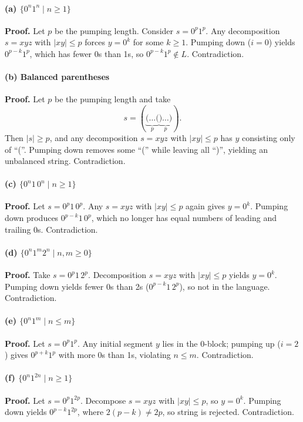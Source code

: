 \documentclass{article}
\theoremstyle{theorem}
\theoremstyle{definition}
\theoremstyle{remark}
\begin{document}
\paragraph{(a) \(\{0^n1^n\mid n\ge1\}\)}
\textbf{Proof.} Let \(p\) be the pumping length. Consider \(s=0^p1^p\). Any decomposition \(s=xyz\) with \(\lvert xy\rvert\le p\) forces \(y=0^k\) for some \(k\ge1\). Pumping down (\(i=0\)) yields \(0^{p-k}1^p\), which has fewer 0s than 1s, so \(0^{p-k}1^p\notin L\). Contradiction.

\paragraph{(b) Balanced parentheses}
\textbf{Proof.} Let \(p\) be the pumping length and take 
\[
s = (\underbrace{( \dots (}_{p}\underbrace{) \dots )}_{p}).
\]
Then \(\lvert s\rvert\ge p\), and any decomposition \(s=xyz\) with \(\lvert xy\rvert\le p\) has \(y\) consisting only of “(”. Pumping down removes some “(” while leaving all “)”, yielding an unbalanced string. Contradiction.

\paragraph{(c) \(\{0^n1\,0^n\mid n\ge1\}\)}
\textbf{Proof.} Let \(s=0^p1\,0^p\). Any \(s=xyz\) with \(\lvert xy\rvert\le p\) again gives \(y=0^k\). Pumping down produces \(0^{p-k}1\,0^p\), which no longer has equal numbers of leading and trailing 0s. Contradiction.

\paragraph{(d) \(\{0^n1^m2^n\mid n,m\ge0\}\)}
\textbf{Proof.} Take \(s=0^p1\,2^p\). Decomposition \(s=xyz\) with \(\lvert xy\rvert\le p\) yields \(y=0^k\). Pumping down yields fewer 0s than 2s (\(0^{p-k}1\,2^p\)), so not in the language. Contradiction.

\paragraph{(e) \(\{0^n1^m\mid n\le m\}\)}
\textbf{Proof.} Let \(s=0^p1^p\). Any initial segment \(y\) lies in the 0-block; pumping up (\(i=2\)) gives \(0^{p+k}1^p\) with more 0s than 1s, violating \(n\le m\). Contradiction.

\paragraph{(f) \(\{0^n1^{2n}\mid n\ge1\}\)}
\textbf{Proof.} Let \(s=0^p1^{2p}\). Decompose \(s=xyz\) with \(\lvert xy\rvert\le p\), so \(y=0^k\). Pumping down yields \(0^{p-k}1^{2p}\), where \(2(p-k)\neq2p\), so string is rejected. Contradiction.
\end{document}
